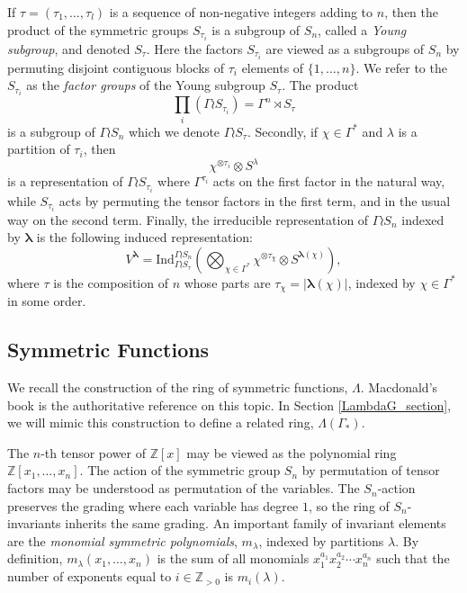 \documentclass[10pt]{article}
\theoremstyle{definition}
\newcommand{\bs}{\boldsymbol}
\newcommand{\LambdaG}{\Lambda(\Gamma_*)}
\begin{document}
If $\tau = (\tau_1, \ldots, \tau_l)$ is a sequence of non-negative integers adding to $n$, then the product of the symmetric groups $S_{\tau_i}$ is a subgroup of $S_n$, called a \emph{Young subgroup}, and denoted $S_\tau$. Here the factors $S_{\tau_i}$ are viewed as a subgroups of $S_n$ by permuting disjoint contiguous blocks of $\tau_i$ elements of $\{1,\ldots, n\}$. We refer to the $S_{\tau_i}$ as the \emph{factor groups} of the Young subgroup $S_\tau$. The product
\[
\prod_{i} (\Gamma \wr S_{\tau_i}) = \Gamma^n \rtimes S_\tau
\]
is a subgroup of $\Gamma \wr S_n$ which we denote $\Gamma \wr S_\tau$. Secondly, if $\chi \in \Gamma^*$ and $\lambda$ is a partition of $\tau_i$, then 
\[
\chi^{\otimes \tau_i} \otimes S^{\lambda}
\]
is a representation of $\Gamma \wr S_{\tau_i}$ where $\Gamma^{\tau_i}$ acts on the first factor in the natural way, while $S_{\tau_i}$ acts by permuting the tensor factors in the first term, and in the usual way on the second term. Finally, the irreducible representation of $\Gamma \wr S_n$ indexed by $\bs\lambda$ is the following induced representation:
\[
V^{\bs\lambda} =
\mathrm{Ind}_{\Gamma \wr S_{\tau}}^{\Gamma \wr S_n} \left( \bigotimes_{\chi \in \Gamma^*} \chi^{\otimes \tau_\chi} \otimes S^{\bs\lambda(\chi)}
\right),
\]
where $\tau$ is the composition of $n$ whose parts are $\tau_\chi = |\bs\lambda(\chi)|$, indexed by $\chi \in \Gamma^*$ in some order.


\subsection{Symmetric Functions} 

We recall the construction of the ring of symmetric functions, $\Lambda$. Macdonald's book \cite{Macdonald} is the authoritative reference on this topic. In Section \ref{LambdaG_section}, we will mimic this construction to define a related ring, $\LambdaG$.

The $n$-th tensor power of $\mathbb{Z}[x]$ may be viewed as the polynomial ring $\mathbb{Z}[x_1, \ldots, x_n]$. The action of the symmetric group $S_n$ by permutation of tensor factors may be understood as permutation of the variables. The $S_n$-action preserves the grading where each variable has degree $1$, so the ring of $S_n$-invariants inherits the same grading. An important family of invariant elements are the \emph{monomial symmetric polynomials}, $m_\lambda$, indexed by partitions $\lambda$. By definition, $m_\lambda(x_1, \ldots, x_n)$ is the sum of all monomials $x_1^{a_1} x_2^{a_2} \cdots x_n^{a_n}$ such that the number of exponents equal to $i \in \mathbb{Z}_{>0}$ is $m_i(\lambda)$.
\end{document}
